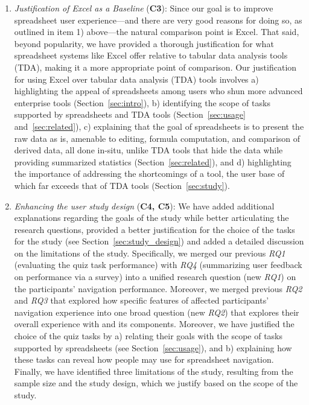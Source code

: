 \begin{enumerate}
\item \textit{Justification of Excel as a Baseline} (\textbf{C3}):
Since our goal is to improve spreadsheet
user experience---and there are very good reasons for doing so,
as outlined in item 1) above---the natural comparison point
is Excel. 
That said, beyond popularity, 
we have provided a thorough justification
for what spreadsheet systems like Excel offer
relative to tabular data analysis tools (TDA),
making it a more appropriate point of comparison.
Our justification for using Excel over 
tabular data analysis (TDA) tools involves 
a) highlighting the appeal of spreadsheets 
among users who shun more advanced enterprise 
tools (Section~\ref{sec:intro}), 
b) identifying the scope of tasks 
supported by spreadsheets and 
TDA tools (Section~\ref{sec:usage} and~\ref{sec:related}), 
c) explaining that the goal of spreadsheets 
is to present the raw data as is, 
amenable to editing, formula computation, 
and comparison of derived data, all done in-situ,
unlike TDA tools that hide the data 
while providing summarized statistics 
(Section~\ref{sec:related}), and 
d) highlighting the importance of 
addressing the shortcomings of a tool, 
the user base of which far exceeds 
that of TDA tools (Section~\ref{sec:study}). 


\item \textit{Enhancing the user study design} 
(\textbf{C4, C5}):
We have added additional 
explanations regarding the goals 
of the study while better articulating 
the research questions, 
provided a better justification 
for the choice of the tasks for the study (see Section~\ref{sec:study_design}) 
and added a detailed discussion on the limitations of the study. 
Specifically, we merged our previous \emph{RQ1} (evaluating the quiz task performance) 
with \emph{RQ4} (summarizing user feedback on performance via a survey) 
into a unified research question (new \emph{RQ1}) 
on the participants' navigation performance. 
Moreover, we merged previous \emph{RQ2} and \emph{RQ3} 
that explored how specific features of \noah 
affected participants' navigation experience 
into one broad question (new \emph{RQ2}) 
that explores their overall experience with \noah and its components. 
Moreover, we have justified the choice of the quiz tasks by 
a) relating their goals with the scope of tasks supported by spreadsheets (see Section~\ref{sec:usage}), 
and b) explaining how these tasks can reveal how people may use \noah 
for spreadsheet navigation. 
Finally, we have identified three limitations of the study, 
resulting from the sample size and the study design, which we justify based on the scope of the study.


\end{enumerate}
